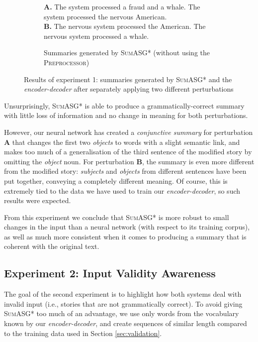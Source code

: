 \begin{figure}[H]
\begin{subfigure}{\textwidth}
\begin{displayquote}
\textbf{A.} The system processed a fraud and a whale. The system processed the nervous American. \\
\textbf{B.} The nervous system processed the American. The nervous system processed a whale.
\end{displayquote}
\caption{Summaries generated by \textsc{SumASG*} (without using the \textsc{Preprocessor})}
\end{subfigure}
\caption{Results of experiment 1: summaries generated by \textsc{SumASG*} and the \textit{encoder-decoder} after separately applying two different perturbations}
\label{fig:experiment_1}
\end{figure}

\noindent
Unsurprisingly, \textsc{SumASG*} is able to produce a grammatically-correct summary with little loss of information and no change in meaning for both perturbations.

However, our neural network has created a \textit{conjunctive summary} for perturbation \textbf{A} that changes the first two \textit{objects} to words with a slight semantic link, and makes too much of a generalisation of the third sentence of the modified story by omitting the \textit{object} noun. For perturbation \textbf{B}, the summary is even more different from the modified story: \textit{subjects} and \textit{objects} from different sentences have been put together, conveying a completely different meaning. Of course, this is extremely tied to the data we have used to train our \textit{encoder-decoder}, so such results were expected.

From this experiment we conclude that \textsc{SumASG*} is more robust to small changes in the input than a neural network (with respect to its training corpus), as well as much more consistent when it comes to producing a summary that is coherent with the original text.

\subsection{Experiment 2: Input Validity Awareness}
\label{subsec:experiment_2}

The goal of the second experiment is to highlight how both systems deal with invalid input (i.e., stories that are not grammatically correct). To avoid giving \textsc{SumASG*} too much of an advantage, we use only words from the vocabulary known by our \textit{encoder-decoder}, and create sequences of similar length compared to the training data used in Section \ref{sec:validation}.

